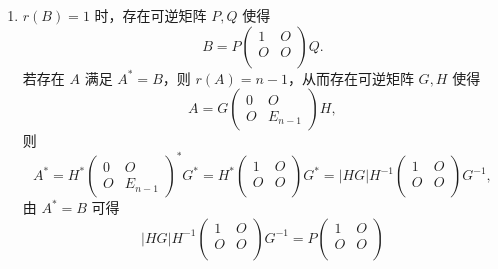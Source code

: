 \begin{exercise}
\begin{exgroup}
\begin{answer}
\begin{enumerate}
\begin{enumerate}
                          \item $r(B) = 1$ 时，存在可逆矩阵 $P, Q$ 使得
                                \[B = P\begin{pmatrix}
                                        1 & O \\
                                        O & O \\
                                    \end{pmatrix}Q.\]
                                若存在 $A$ 满足 $A^{*} = B$，则 $r(A) = n-1$，从而存在可逆矩阵 $G, H$ 使得
                                \[A = G\begin{pmatrix}
                                        0 & O       \\
                                        O & E_{n-1}
                                    \end{pmatrix}H,\]
                                则
                                \[A^* = H^*\begin{pmatrix}
                                        0 & O       \\
                                        O & E_{n-1}
                                    \end{pmatrix}^*G^* = H^*\begin{pmatrix}
                                        1 & O \\
                                        O & O \\
                                    \end{pmatrix}G^* = \lvert HG \rvert H^{-1}\begin{pmatrix}
                                        1 & O \\
                                        O & O \\
                                    \end{pmatrix}G^{-1},\]
                                由 $A^* = B$ 可得
                                \[\lvert HG \rvert H^{-1}\begin{pmatrix}
                                        1 & O \\
                                        O & O \\
                                    \end{pmatrix}G^{-1} = P\begin{pmatrix}
                                        1 & O \\
                                        O & O \\

\end{pmatrix}\]
\end{enumerate}
\end{enumerate}
\end{answer}
\end{exgroup}
\end{exercise}
